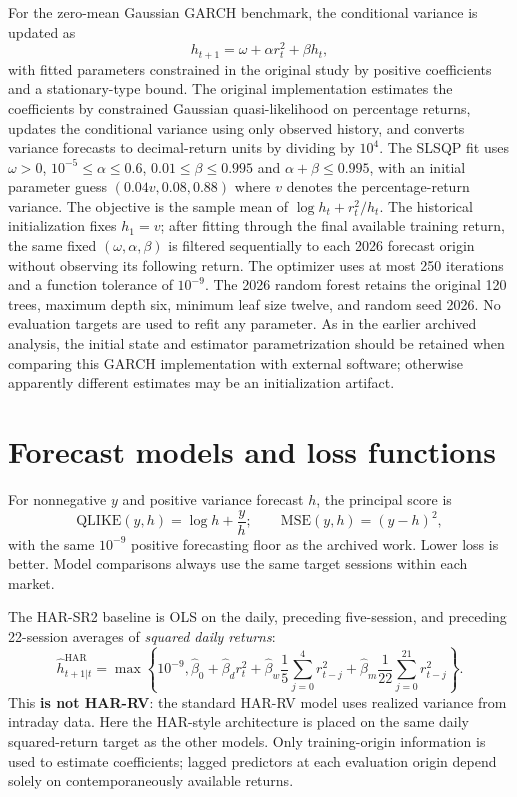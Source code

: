For the zero-mean Gaussian GARCH benchmark, the conditional variance is updated as
\begin{equation}\label{eq:garch-restored}
h_{t+1}=\omega+\alpha r_t^2+\beta h_t,
\end{equation}
with fitted parameters constrained in the original study by positive coefficients and a stationary-type bound. The original implementation estimates the coefficients by constrained Gaussian quasi-likelihood on percentage returns, updates the conditional variance using only observed history, and converts variance forecasts to decimal-return units by dividing by $10^4$. The SLSQP fit uses $\omega>0$, $10^{-5}\le\alpha\le0.6$, $0.01\le\beta\le0.995$ and $\alpha+\beta\le0.995$, with an initial parameter guess $(0.04v,0.08,0.88)$ where $v$ denotes the percentage-return variance. The objective is the sample mean of $\log h_t+r_t^2/h_t$. The historical initialization fixes $h_1=v$; after fitting through the final available training return, the same fixed $(\omega,\alpha,\beta)$ is filtered sequentially to each 2026 forecast origin without observing its following return. The optimizer uses at most 250 iterations and a function tolerance of $10^{-9}$. The 2026 random forest retains the original 120 trees, maximum depth six, minimum leaf size twelve, and random seed 2026. No evaluation targets are used to refit any parameter. As in the earlier archived analysis, the initial state and estimator parametrization should be retained when comparing this GARCH implementation with external software; otherwise apparently different estimates may be an initialization artifact.

\section{Forecast models and loss functions}
For nonnegative $y$ and positive variance forecast $h$, the principal score is
\begin{equation}
\mathrm{QLIKE}(y,h)=\log h+\frac{y}{h}; \qquad \mathrm{MSE}(y,h)=(y-h)^2,
\end{equation}
with the same $10^{-9}$ positive forecasting floor as the archived work. Lower loss is better. Model comparisons always use the same target sessions within each market.

The HAR-SR2 baseline is OLS on the daily, preceding five-session, and preceding 22-session averages of \emph{squared daily returns}:
\begin{equation}
\widehat h^{\mathrm{HAR}}_{t+1|t}=\max\!\left\{10^{-9},\widehat\beta_0 +\widehat\beta_d r_t^2 +\widehat\beta_w\frac{1}{5}\sum_{j=0}^4r_{t-j}^2+\widehat\beta_m\frac{1}{22}\sum_{j=0}^{21}r_{t-j}^2\right\}.
\end{equation}
This \textbf{is not HAR-RV}: the standard HAR-RV model uses realized variance from intraday data. Here the HAR-style architecture is placed on the same daily squared-return target as the other models. Only training-origin information is used to estimate coefficients; lagged predictors at each evaluation origin depend solely on contemporaneously available returns.


